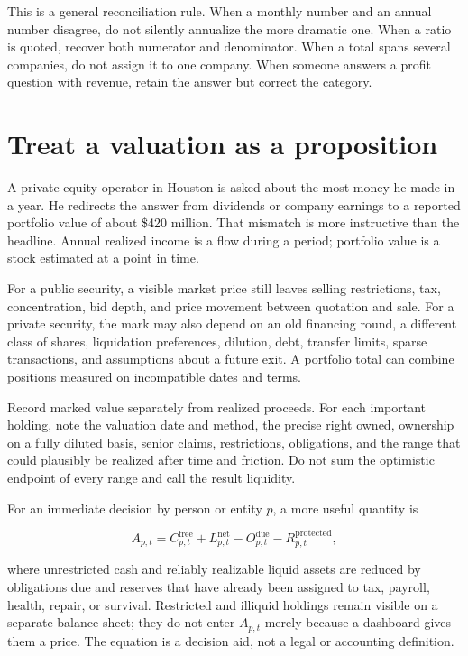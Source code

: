 This is a general reconciliation rule. When a monthly number and an annual
number disagree, do not silently annualize the more dramatic one. When a ratio
is quoted, recover both numerator and denominator. When a total spans several
companies, do not assign it to one company. When someone answers a profit
question with revenue, retain the answer but correct the category.

\section{Treat a valuation as a proposition}

A private-equity operator in Houston is asked about the most money he made in a
year. He redirects the answer from dividends or company earnings to a reported
portfolio value of about \$420 million. That mismatch is more instructive than
the headline. Annual realized income is a flow during a period; portfolio value
is a stock estimated at a point in time.

For a public security, a visible market price still leaves selling restrictions,
tax, concentration, bid depth, and price movement between quotation and sale.
For a private security, the mark may also depend on an old financing round, a
different class of shares, liquidation preferences, dilution, debt, transfer
limits, sparse transactions, and assumptions about a future exit. A portfolio
total can combine positions measured on incompatible dates and terms.

Record marked value separately from realized proceeds. For each important
holding, note the valuation date and method, the precise right owned, ownership
on a fully diluted basis, senior claims, restrictions, obligations, and the
range that could plausibly be realized after time and friction. Do not sum the
optimistic endpoint of every range and call the result liquidity.

For an immediate decision by person or entity \(p\), a more useful quantity is

\begin{equation}
A_{p,t}=C^{\mathrm{free}}_{p,t}+L^{\mathrm{net}}_{p,t}
       -O^{\mathrm{due}}_{p,t}-R^{\mathrm{protected}}_{p,t},
\end{equation}

where unrestricted cash and reliably realizable liquid assets are reduced by
obligations due and reserves that have already been assigned to tax, payroll,
health, repair, or survival. Restricted and illiquid holdings remain visible
on a separate balance sheet; they do not enter \(A_{p,t}\) merely because a
dashboard gives them a price. The equation is a decision aid, not a legal or
accounting definition.

